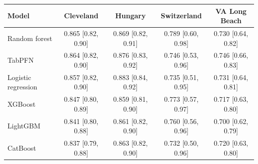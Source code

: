 \begin{tabular}{lcccc}
\toprule
Model & Cleveland & Hungary & Switzerland & VA Long Beach \\
\midrule
Random forest & 0.865 [0.82, 0.90] & 0.869 [0.82, 0.91] & 0.789 [0.60, 0.98] & 0.730 [0.64, 0.82] \\
TabPFN & 0.864 [0.82, 0.90] & 0.876 [0.83, 0.92] & 0.746 [0.53, 0.96] & 0.746 [0.66, 0.83] \\
Logistic regression & 0.857 [0.82, 0.90] & 0.883 [0.84, 0.92] & 0.735 [0.51, 0.95] & 0.731 [0.64, 0.81] \\
XGBoost & 0.847 [0.80, 0.89] & 0.859 [0.81, 0.90] & 0.773 [0.57, 0.97] & 0.717 [0.63, 0.80] \\
LightGBM & 0.841 [0.80, 0.88] & 0.861 [0.82, 0.90] & 0.760 [0.56, 0.96] & 0.700 [0.62, 0.79] \\
CatBoost & 0.837 [0.79, 0.88] & 0.863 [0.82, 0.90] & 0.732 [0.50, 0.96] & 0.720 [0.63, 0.80] \\
\bottomrule
\end{tabular}
